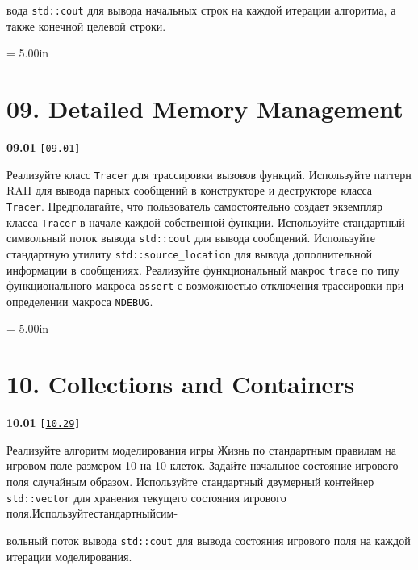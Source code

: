 \documentclass[a4paper,12pt]{article}
\begin{document}
вода \lstinline{std::cout} для вывода начальных строк на каждой итерации алгоритма, а также конечной целевой строки.





\newpage\thispagestyle{empty}\pdfpageheight = 5.00in\enlargethispage{100in}

\section{09. Detailed Memory Management}

{\large \textbf{09.01} \texttt{[\href{https://github.com/i-s-m-mipt/Education/blob/master/projects/examples/source/09.01.cpp}{\texttt{09.01}}]}}

\bigskip

Реализуйте класс \lstinline{Tracer} для трассировки вызовов функций. Используйте паттерн RAII для вывода парных сообщений в конструкторе и деструкторе класса \lstinline{Tracer}. Предполагайте, что пользователь самостоятельно создает экземпляр класса \lstinline{Tracer} в начале каждой собственной функции. Используйте стандартный символьный поток вывода \lstinline{std::cout} для вывода сообщений. Используйте стандартную утилиту \lstinline{std::source_location} для вывода дополнительной информации в сообщениях. Реализуйте функциональный макрос \lstinline{trace} по типу функционального макроса \lstinline{assert} с возможностью отключения трассировки при определении макроса \lstinline{NDEBUG}.



\newpage\thispagestyle{empty}\pdfpageheight = 5.00in\enlargethispage{100in}

\section{10. Collections and Containers}

{\large \textbf{10.01} \texttt{[\href{https://github.com/i-s-m-mipt/Education/blob/master/projects/examples/source/10.29.cpp}{\texttt{10.29}}]}}

\bigskip

Реализуйте алгоритм моделирования игры Жизнь по стандартным правилам на игровом поле размером 10 на 10 клеток. Задайте начальное состояние игрового поля случайным образом. Используйте стандартный двумерный контейнер \lstinline{std::vector} для хранения текущего состояния игрового поля.\:Используйте\:стандартный\:сим- 

вольный поток вывода \lstinline{std::cout} для вывода состояния игрового поля на каждой итерации моделирования.
\end{document}
